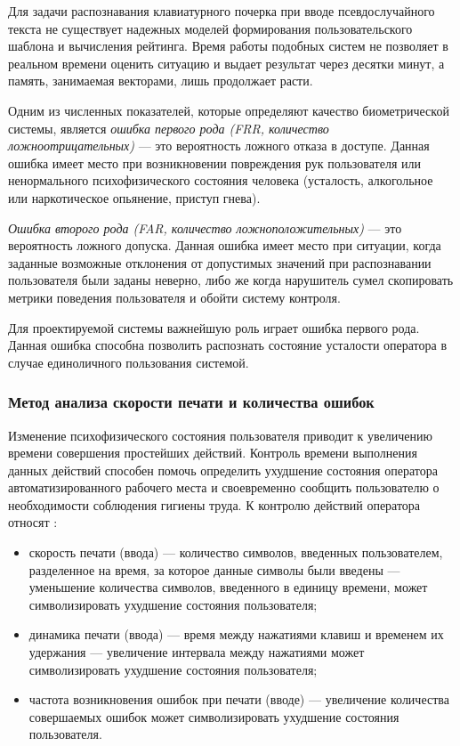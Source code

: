 Для задачи распознавания клавиатурного почерка при вводе псевдослучайного текста не существует надежных моделей формирования пользовательского шаблона и вычисления рейтинга. Время работы подобных систем не позволяет в реальном времени оценить ситуацию и выдает результат через десятки минут, а память, занимаемая векторами, лишь продолжает расти. \cite{keystroke}

Одним из численных показателей, которые определяют качество биометрической системы, является \textit{ошибка первого рода (FRR, количество ложноотрицательных)} --- это вероятность ложного отказа в доступе. Данная ошибка имеет место при возникновении повреждения рук пользователя или ненормального психофизического состояния человека (усталость, алкогольное или наркотическое опьянение, приступ гнева).\cite{keystroke}

\textit{Ошибка второго рода (FAR, количество ложноположительных)} --- это вероятность ложного допуска. Данная ошибка имеет место при ситуации, когда заданные возможные отклонения от допустимых значений при распознавании пользователя были заданы неверно, либо же когда нарушитель сумел скопировать метрики поведения пользователя и обойти систему контроля. \cite{keystroke}

Для проектируемой системы важнейшую роль играет ошибка первого рода. Данная ошибка способна позволить распознать состояние усталости оператора в случае единоличного пользования системой.

\subsubsection{Метод анализа скорости печати и количества ошибок}
Изменение психофизического состояния пользователя приводит к увеличению времени совершения простейших действий. Контроль времени выполнения данных действий способен помочь определить ухудшение состояния оператора автоматизированного рабочего места и своевременно сообщить пользователю о необходимости соблюдения гигиены труда. К контролю действий оператора относят \cite{typeFatigue}:
\begin{itemize}
\item скорость печати (ввода) --- количество символов, введенных пользователем, разделенное на время, за которое данные символы были введены --- уменьшение количества символов, введенного в единицу времени, может символизировать ухудшение состояния пользователя;
\item динамика печати (ввода) --- время между нажатиями клавиш и временем их удержания --- увеличение интервала между нажатиями может символизировать ухудшение состояния пользователя;
\item частота возникновения ошибок при печати (вводе) --- увеличение количества совершаемых ошибок может символизировать ухудшение состояния пользователя.
\end{itemize}

